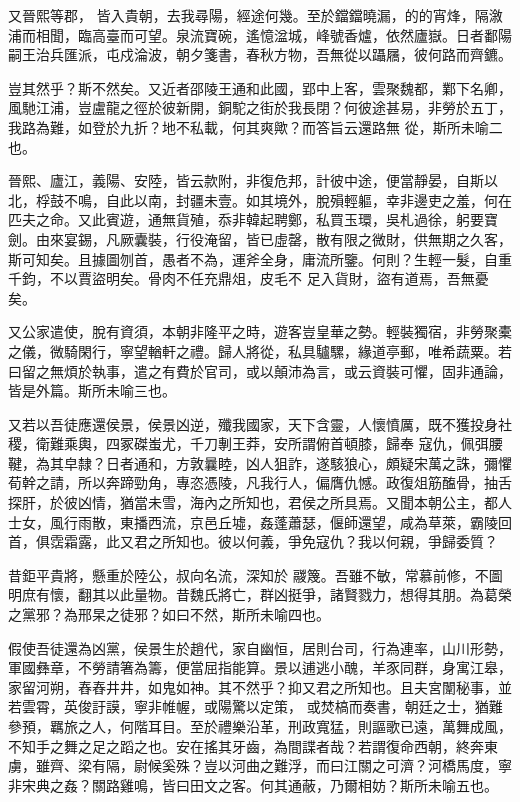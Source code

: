 \begin{pinyinscope}
 又晉熙等郡，
 皆入貴朝，去我尋陽，經途何幾。至於鐺鐺曉漏，的的宵烽，隔漵浦而相聞，臨高臺而可望。泉流寶碗，遙憶湓城，峰號香爐，依然廬嶽。日者鄱陽嗣王治兵匯派，屯戍淪波，朝夕箋書，春秋方物，吾無從以躡屩，彼何路而齊鑣。



 豈其然乎？斯不然矣。又近者邵陵王通和此國，郢中上客，雲聚魏都，鄴下名卿，風馳江浦，豈盧龍之徑於彼新開，銅駝之街於我長閉？何彼途甚易，非勞於五丁，我路為難，如登於九折？地不私載，何其爽歟？而答旨云還路無
 從，斯所未喻二也。



 晉熙、廬江，義陽、安陸，皆云款附，非復危邦，計彼中途，便當靜晏，自斯以北，桴鼓不鳴，自此以南，封疆未壹。如其境外，脫殞輕軀，幸非邊吏之羞，何在匹夫之命。又此賓遊，通無貨殖，忝非韓起聘鄭，私買玉環，吳札過徐，躬要寶劍。由來宴錫，凡厥囊裝，行役淹留，皆已虛罄，散有限之微財，供無期之久客，斯可知矣。且據圖刎首，愚者不為，運斧全身，庸流所鑒。何則？生輕一髮，自重千鈞，不以賈盜明矣。骨肉不任充鼎俎，皮毛不
 足入貨財，盜有道焉，吾無憂矣。



 又公家遣使，脫有資須，本朝非隆平之時，遊客豈皇華之勢。輕裝獨宿，非勞聚橐之儀，微騎閑行，寧望輶軒之禮。歸人將從，私具驢騾，緣道亭郵，唯希蔬粟。若曰留之無煩於執事，遣之有費於官司，或以顛沛為言，或云資裝可懼，固非通論，皆是外篇。斯所未喻三也。



 又若以吾徒應還侯景，侯景凶逆，殲我國家，天下含靈，人懷憤厲，既不獲投身社稷，衛難乘輿，四冢磔蚩尤，千刀剸王莽，安所謂俯首頓膝，歸奉
 寇仇，佩弭腰鞬，為其皁隸？日者通和，方敦曩睦，凶人狙詐，遂駭狼心，頗疑宋萬之誅，彌懼荀幹之請，所以奔蹄勁角，專恣憑陵，凡我行人，偏膺仇憾。政復俎筋醢骨，抽舌探肝，於彼凶情，猶當未雪，海內之所知也，君侯之所具焉。又聞本朝公主，都人士女，風行雨散，東播西流，京邑丘墟，姦蓬蕭瑟，偃師還望，咸為草萊，霸陵回首，俱霑霜露，此又君之所知也。彼以何義，爭免寇仇？我以何親，爭歸委質？



 昔鉅平貴將，懸重於陸公，叔向名流，深知於
 鬷篾。吾雖不敏，常慕前修，不圖明庶有懷，翻其以此量物。昔魏氏將亡，群凶挺爭，諸賢戮力，想得其朋。為葛榮之黨邪？為邢杲之徒邪？如曰不然，斯所未喻四也。



 假使吾徒還為凶黨，侯景生於趙代，家自幽恒，居則台司，行為連率，山川形勢，軍國彝章，不勞請箸為籌，便當屈指能算。景以逋逃小醜，羊豕同群，身寓江皋，家留河朔，舂舂井井，如鬼如神。其不然乎？抑又君之所知也。且夫宮闈秘事，並若雲霄，英俊訏謨，寧非帷幄，或陽驚以定策，
 或焚槁而奏書，朝廷之士，猶難參預，羈旅之人，何階耳目。至於禮樂沿革，刑政寬猛，則謳歌已遠，萬舞成風，不知手之舞之足之蹈之也。安在搖其牙齒，為間諜者哉？若謂復命西朝，終奔東虜，雖齊、梁有隔，尉候奚殊？豈以河曲之難浮，而曰江關之可濟？河橋馬度，寧非宋典之姦？關路雞鳴，皆曰田文之客。何其通蔽，乃爾相妨？斯所未喻五也。




\end{pinyinscope}
